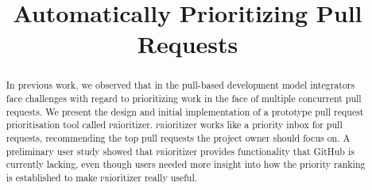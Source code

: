 \documentclass[conference]{IEEEtran}
\begin{document}
\newcommand{\ghtorrent}{\textsc{ght}orrent\xspace}
\newcommand{\prioritizer}{\textsc{pr}ioritizer\xspace}
\newcommand{\api}{\textsc{api}\xspace}
\newcommand{\todo}[1]{\textcolor{red}{\textbf{\textsc{todo:}} #1}}

\newcommand{\nb}[3]{
  \fcolorbox{black}{#2}{\bfseries\sffamily\scriptsize#1}
    {\sf\small$\blacktriangleright$\textit{#3}$\blacktriangleleft$}
}

\newcommand\georgios[1]{\nb{Georgios}{yellow}{#1}}
\newcommand\andy[1]{\nb{Andy}{cyan}{#1}}
\newcommand\erik[1]{\nb{Erik}{magenta}{#1}}

\newcommand{\hassanbox}[1]
{
  \vspace{0.29em}
  \noindent
  \fbox{
  \begin{minipage}{0.46\textwidth}
    \emph{\noindent #1}
    \end{minipage}
}}

\newcommand{\resp}[2]{{\sc R#1:} ``\emph{#2}''}
\newcommand{\respnum}[1]{{\sc R#1}}
\newcommand{\code}[1]{{\textsl{#1}}}

\title{Automatically Prioritizing Pull Requests}


\author{
\and
{}
\and
{}
}

\maketitle

\begin{abstract}

In previous work, we observed that in the pull-based development model integrators face challenges with regard to prioritizing work in the face of multiple concurrent pull requests. We present the design and initial implementation of a prototype pull request prioritisation tool called \prioritizer. \prioritizer works like a priority inbox for pull requests, recommending the top pull requests the project owner should focus on. A preliminary user study showed that \prioritizer provides functionality that GitHub is currently lacking, even though users needed more insight into how the priority ranking is established to make \prioritizer really useful.

\end{abstract}
\end{document}
